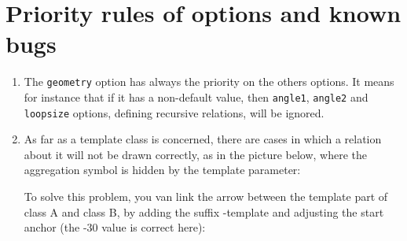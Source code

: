 \documentclass[a4paper,11pt]{report}
\begin{document}
\medskip

\begin{minipage}{0.5\textwidth}
	
\end{minipage}
\begin{minipage}{0.5\textwidth}
	\begin{center}
	\end{center}
\end{minipage}

\section{Priority rules of options and known bugs}\label{s.classbug}

\begin{enumerate}
	\item The {\tt geometry} option has always the priority on the others options. It means for instance that if it has a non-default value, then {\tt angle1}, {\tt angle2} and {\tt loopsize} options, defining recursive relations, will be ignored.
	\item As far as a template class is concerned, there are cases in which a relation about it will not be drawn correctly, as in the picture below, where the aggregation symbol is hidden by the template parameter:

	      \begin{minipage}{0.6\textwidth}
		      
	      \end{minipage}
	      \begin{minipage}{0.4\textwidth}
		      \begin{center}
		      \end{center}
	      \end{minipage}

	      \medskip

	      To solve this problem,  you van link the arrow between the template part of class A and class B, by adding the suffix -template and adjusting the start anchor (the -30 value is correct here):

	      \medskip

	      \begin{minipage}{0.6\textwidth}
		      
	      \end{minipage}
	      \begin{minipage}{0.4\textwidth}
		      \begin{center}
		      \end{center}
	      \end{minipage}


\end{enumerate}
\end{document}

